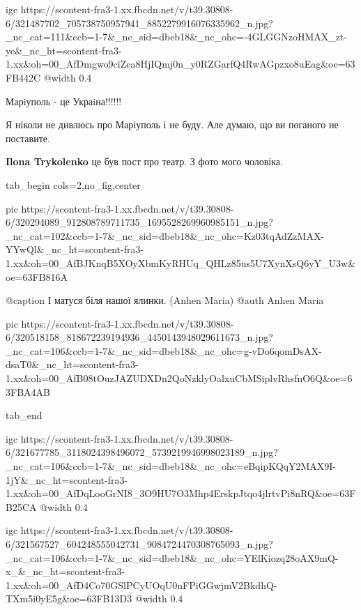 
\ifcmt
  igc https://scontent-fra3-1.xx.fbcdn.net/v/t39.30808-6/321487702_705738750957941_8852279916076335962_n.jpg?_nc_cat=111&ccb=1-7&_nc_sid=dbeb18&_nc_ohc=-4GLGGNzoHMAX_zt-ye&_nc_ht=scontent-fra3-1.xx&oh=00_AfDmgwo9ciZea8HjIQmj0n_y0RZGarfQ4RwAGpzxo8uEag&oe=63FB442C
  @width 0.4
\fi


Марiуполь - це Украiна!!!!!!


Я ніколи не дивлюсь про Маріуполь і не буду. Але думаю, що ви поганого не
поставите.

\begin{itemize} %
\textbf{Ilona Trykolenko} це був пост про театр. З фото мого чоловіка.
\end{itemize} %


\ifcmt
  tab_begin cols=2,no_fig,center

     pic https://scontent-fra3-1.xx.fbcdn.net/v/t39.30808-6/320294089_912808789711735_1695528269960985151_n.jpg?_nc_cat=102&ccb=1-7&_nc_sid=dbeb18&_nc_ohc=Kz03tqAdZzMAX-YYwQl&_nc_ht=scontent-fra3-1.xx&oh=00_AfBJKnqB5XOyXbmKyRHUq_QHLz85us5U7XynXsQ6yY_U3w&oe=63FB816A

     @caption І матуся біля нашої ялинки. (Anhen Maria)
     @auth Anhen Maria

     pic https://scontent-fra3-1.xx.fbcdn.net/v/t39.30808-6/320518158_818672239194936_4450143948029611673_n.jpg?_nc_cat=106&ccb=1-7&_nc_sid=dbeb18&_nc_ohc=g-vDo6qomDsAX-dsaT0&_nc_ht=scontent-fra3-1.xx&oh=00_AfB08tOuzJAZUDXDn2QoNzklyOalxuCbMSiplvRhsfnO6Q&oe=63FBA4AB

  tab_end
\fi


\ifcmt
  igc https://scontent-fra3-1.xx.fbcdn.net/v/t39.30808-6/321677785_3118024398496072_5739219946998023189_n.jpg?_nc_cat=106&ccb=1-7&_nc_sid=dbeb18&_nc_ohc=eBqipKQqY2MAX9I-1jY&_nc_ht=scontent-fra3-1.xx&oh=00_AfDqLooGrNI8_3O9HU7O3Mhp4ErskpJtqo4jlrtvPi8nRQ&oe=63FB25CA
  @width 0.4
\fi


\ifcmt
  igc https://scontent-fra3-1.xx.fbcdn.net/v/t39.30808-6/321567527_604248555042731_9084724470308765093_n.jpg?_nc_cat=106&ccb=1-7&_nc_sid=dbeb18&_nc_ohc=YElKiozq28oAX9mQ-x_&_nc_ht=scontent-fra3-1.xx&oh=00_AfD4Co70GSlPCyUOqU0nFPiGGwjmV2BkdhQ-TXm5i0yE5g&oe=63FB13D3
  @width 0.4
\fi

